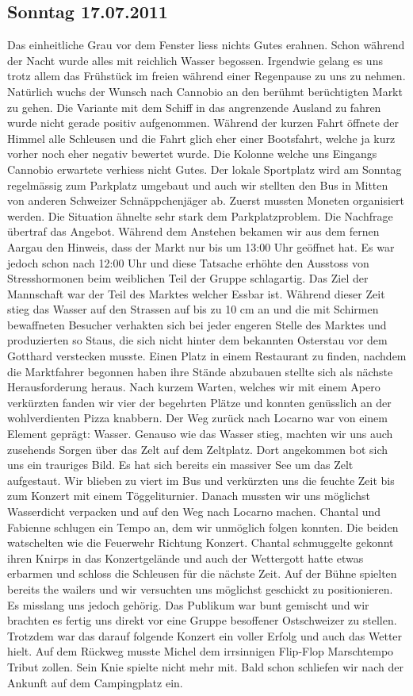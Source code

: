\subsection{Sonntag 17.07.2011}
Das einheitliche Grau vor dem Fenster liess nichts Gutes erahnen.
Schon während der Nacht wurde alles mit reichlich Wasser begossen.
Irgendwie gelang es uns trotz allem das Frühstück im freien während einer Regenpause zu uns zu nehmen.
Natürlich wuchs der Wunsch nach Cannobio an den berühmt berüchtigten Markt zu gehen.
Die Variante mit dem Schiff in das angrenzende Ausland zu fahren wurde nicht gerade positiv aufgenommen.
Während der kurzen Fahrt öffnete der Himmel alle Schleusen und die Fahrt glich eher einer Bootsfahrt, welche ja kurz vorher noch eher negativ bewertet wurde.
Die Kolonne welche uns Eingangs Cannobio erwartete verhiess nicht Gutes.
Der lokale Sportplatz wird am Sonntag regelmässig zum Parkplatz umgebaut und auch wir stellten den Bus in Mitten von anderen Schweizer Schnäppchenjäger ab.
Zuerst mussten Moneten organisiert werden.
Die Situation ähnelte sehr stark dem Parkplatzproblem.
Die Nachfrage übertraf das Angebot.
Während dem Anstehen bekamen wir aus dem fernen Aargau den Hinweis, dass der Markt nur bis um 13:00 Uhr geöffnet hat.
Es war jedoch schon nach 12:00 Uhr und diese Tatsache erhöhte den Ausstoss von Stresshormonen beim weiblichen Teil der Gruppe schlagartig.
Das Ziel der Mannschaft war der Teil des Marktes welcher Essbar ist.
Während dieser Zeit stieg das Wasser auf den Strassen auf bis zu 10 cm an und die mit Schirmen bewaffneten Besucher verhakten sich bei jeder engeren Stelle des Marktes und produzierten so Staus, die sich nicht hinter dem bekannten Osterstau vor dem Gotthard verstecken musste.
Einen Platz in einem Restaurant zu finden, nachdem die Marktfahrer begonnen haben ihre Stände abzubauen stellte sich als nächste Herausforderung heraus.
Nach kurzem Warten, welches wir mit einem Apero verkürzten fanden wir vier der begehrten Plätze und konnten genüsslich an der wohlverdienten Pizza knabbern.
Der Weg zurück nach Locarno war von einem Element geprägt: Wasser.
Genauso wie das Wasser stieg, machten wir uns auch zusehends Sorgen über das Zelt auf dem Zeltplatz.
Dort angekommen bot sich uns ein trauriges Bild.
Es hat sich bereits ein massiver See um das Zelt aufgestaut.
Wir blieben zu viert im Bus und verkürzten uns die feuchte Zeit bis zum Konzert mit einem Töggeliturnier.
Danach  mussten wir uns möglichst Wasserdicht verpacken und auf den Weg nach Locarno machen.
Chantal und Fabienne schlugen ein Tempo an, dem wir unmöglich folgen konnten.
Die beiden watschelten wie die Feuerwehr Richtung Konzert.
Chantal schmuggelte gekonnt ihren Knirps in das Konzertgelände und auch der Wettergott hatte etwas erbarmen und schloss die Schleusen für die nächste Zeit.
Auf der Bühne spielten bereits the wailers und wir versuchten uns möglichst geschickt zu positionieren.
Es misslang uns jedoch gehörig.
Das Publikum war bunt gemischt und wir brachten es fertig uns direkt vor eine Gruppe besoffener Ostschweizer zu stellen.
Trotzdem war das darauf folgende Konzert ein voller Erfolg und auch das Wetter hielt.
Auf dem Rückweg musste Michel dem irrsinnigen Flip-Flop Marschtempo Tribut zollen.
Sein Knie spielte nicht mehr mit.
Bald schon schliefen wir nach der Ankunft auf dem Campingplatz ein.

